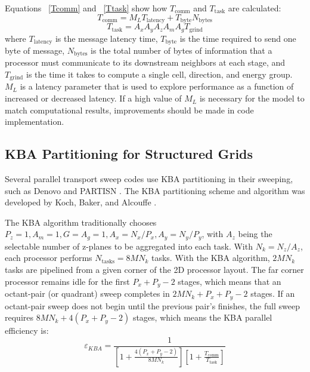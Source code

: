 \documentclass[11pt, letterpaper,titlepage,oneside]{article}
\begin{document}
Equations ~\eqref{Tcomm} and ~\eqref{Ttask} show how $T_{\text{comm}}$ and $T_{\text{task}}$ are calculated:
\begin{equation}
T_{\text{comm}} = M_L T_{\text{latency}} + T_{\text{byte}} N_{\text{bytes}}
\label{Tcomm}
\end{equation}
\begin{equation}
T_{\text{task}} = A_x A_y A_z A_m A_g T_{\text{grind}}
\label{Ttask}
\end{equation}
where $T_{\text{latency}}$ is the message latency time, $T_{\text{byte}}$ is the time required to send one byte of message, $N_{\text{bytes}}$ is the total number of bytes of information that a processor must communicate to its downstream neighbors at each stage, and $T_{\text{grind}}$ is the time it takes to compute a single cell, direction, and energy group. $M_L$ is a latency parameter that is used to explore performance as a function of increased or decreased latency. If a high value of $M_L$ is necessary for the model to match computational results, improvements should be made in code implementation.

\subsection{KBA Partitioning for Structured Grids}

Several parallel transport sweep codes use KBA partitioning in their sweeping, such as Denovo \cite{denovo} and PARTISN \cite{partisn}. The KBA partitioning scheme and algorithm was developed by Koch, Baker, and Alcouffe \cite{partisn}.

The KBA algorithm traditionally chooses $P_z = 1, A_m = 1, G = A_g = 1, A_x = N_x/P_x, A_y = N_y/P_y$, with $A_z$ being the selectable number of z-planes to be aggregated into each task. With $N_k = N_z/A_z$, each processor performs $N_{\text{tasks}} = 8MN_k$ tasks. With the KBA algorithm, $2MN_k$ tasks are pipelined from a given corner of the 2D processor layout. The far corner processor remains idle for the first $P_x + P_y - 2 $ stages, which means that an octant-pair (or quadrant) sweep completes in $2MN_k + P_x + P_y - 2$ stages. If an octant-pair sweep does not begin until the previous pair's finishes, the full sweep requires $8MN_k + 4(P_x+P_y-2)$ stages, which means the KBA parallel efficiency is:
\begin{equation}
\varepsilon_{KBA} = \frac{1}{[1+\frac{4(P_x+P_y-2)}{8MN_k}][1+\frac{T_{\text{comm}}}{T_{\text{task}}}]}
\label{eKBA}
\end{equation}
\end{document}
